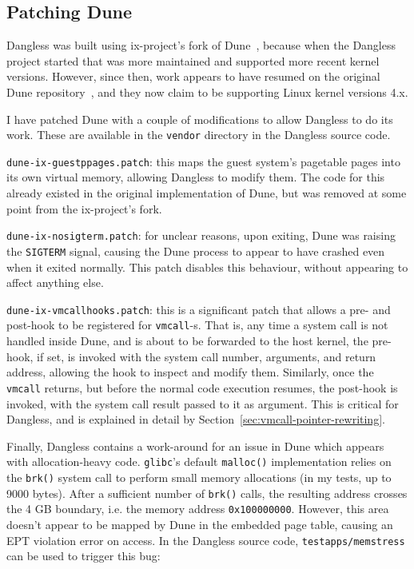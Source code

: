 \subsection{Patching Dune}

Dangless was built using ix-project's fork of Dune~\cite{dune-github-ix}, because when the Dangless project started that was more maintained and supported more recent kernel versions. However, since then, work appears to have resumed on the original Dune repository~\cite{dune-github-original}, and they now claim to be supporting Linux kernel versions 4.x.

I have patched Dune with a couple of modifications to allow Dangless to do its work. These are available in the \texttt{vendor} directory in the Dangless source code.

\texttt{dune-ix-guestppages.patch}: this maps the guest system's pagetable pages into its own virtual memory, allowing Dangless to modify them. The code for this already existed in the original implementation of Dune, but was removed at some point from the ix-project's fork.
 
\texttt{dune-ix-nosigterm.patch}: for unclear reasons, upon exiting, Dune was raising the \lstinline!SIGTERM! signal, causing the Dune process to appear to have crashed even when it exited normally. This patch disables this behaviour, without appearing to affect anything else.

\texttt{dune-ix-vmcallhooks.patch}: this is a significant patch that allows a pre- and post-hook to be registered for \lstinline!vmcall!-s. That is, any time a system call is not handled inside Dune, and is about to be forwarded to the host kernel, the pre-hook, if set, is invoked with the system call number, arguments, and return address, allowing the hook to inspect and modify them. Similarly, once the \lstinline!vmcall! returns, but before the normal code execution resumes, the post-hook is invoked, with the system call result passed to it as argument. This is critical for Dangless, and is explained in detail by Section~\ref{sec:vmcall-pointer-rewriting}.

Finally, Dangless contains a work-around for an issue in Dune which appears with allocation-heavy code. \texttt{glibc}'s default \lstinline!malloc()! implementation relies on the \lstinline!brk()! system call to perform small memory allocations (in my tests, up to 9000 bytes). After a sufficient number of \lstinline!brk()! calls, the resulting address crosses the 4 GB boundary, i.e. the memory address \texttt{0x100000000}. However, this area doesn't appear to be mapped by Dune in the embedded page table, causing an EPT violation error on access. In the Dangless source code, \texttt{testapps/memstress} can be used to trigger this bug:

